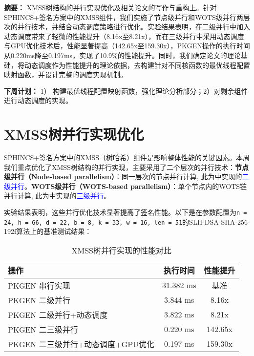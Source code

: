 \documentclass[report]{../../custom}
\begin{document}
\maketitle

\noindent \textbf{摘要：}
XMSS树结构的并行实现优化及相关论文的写作与重构上。针对SPHINCS+签名方案中的XMSS组件，我们实施了节点级并行和WOTS级并行两层次的并行技术，并结合动态调度策略进行优化。实验结果表明，在二级并行中加入动态调度带来了轻微的性能提升（8.16x至8.21x），而在三级并行中采用动态调度与GPU优化技术后，性能显著提高（142.65x至159.30x），PKGEN操作的执行时间从0.220ms降至0.197ms，实现了10.9\%的性能提升。同时，我们确定论文的理论基础，将动态调度作为性能提升的理论依据，去构建针对不同核函数的最优线程配置映射函数，并设计完整的调度实现机制。

\vskip 0.5cm

\noindent \textbf{下周计划：} 1） 构建最优线程配置映射函数，强化理论分析部分；2）对剩余组件进行动态调度的实现。

\section{XMSS树并行实现优化}

SPHINCS+签名方案中的XMSS（树哈希）组件是影响整体性能的关键因素。本周我们重点优化了XMSS树结构的并行实现，主要采用了二个层次的并行技术：\textbf{节点级并行（Node-based parallelism）}：同一层次的节点并行计算, 此为\cite{Wang2025}中实现的\textcolor{blue}{二级并行}。\textbf{WOTS级并行（WOTS-based parallelism）}：单个节点内的WOTS链并行计算, 此为\cite{Wang2025}中实现的\textcolor{blue}{三级并行}。

实验结果表明，这些并行优化技术显著提高了签名性能。以下是在参数配置为\texttt{n = 24, h = 66, d = 22, b = 8, k = 33, w = 16, len = 51}的SLH-DSA-SHA-256-192f算法上的基准测试结果：

\begin{table}[ht]
  \centering
  \begin{tabular}{|l|c|c|}
    \hline
    \textbf{操作} & \textbf{执行时间} & \textbf{性能提升} \\
    \hline
    PKGEN 串行实现 \cite{Wang2025} & 31.382 ms & 基准 \\
    \hline
    PKGEN 二级并行 \cite{Wang2025} & 3.844 ms & 8.16x \\
    \hline
    PKGEN 二级并行+动态调度 & 3.822 ms & 8.21x \\
    \hline
    PKGEN 二三级并行 \cite{Wang2025} & 0.220 ms & 142.65x \\
    \hline
    PKGEN 二三级并行+动态调度+GPU优化 & 0.197 ms & 159.30x \\
    \hline
  \end{tabular}
  \caption{XMSS树并行实现的性能对比}
  \label{tab:xmss_performance}
\end{table}
\end{document}
